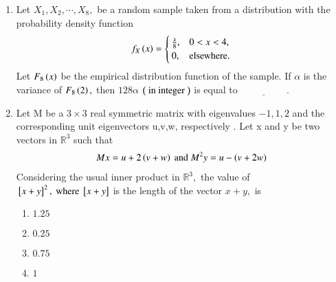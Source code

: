 \documentclass[journal]{IEEEtran}
\begin{document}
\begin{enumerate} [start=27]
\bigskip
\item Let $X_{1},X_{2},\cdots,X_{8},$ be a random sample taken from a distribution with the probability density function
\begin{align*}
    f_{X}\left(x\right) = 
\begin{cases} 
\frac{x}{8}, & 0 < x < 4, \\
0, & \text{elsewhere}.
\end{cases}
\end{align*}
Let $F_{8}\left(x\right)$ be the empirical distribution function of the sample. If $\alpha$ is the variance of  $F_{8}\left(2\right),$ then $128\alpha$  $\left(\text{ in integer }\right)$  is equal to $\underline{\hspace{2cm}}.$
\bigskip
\item Let M be a $3\times3$ real symmetric matrix with eigenvalues $-1,1,2$ and the corresponding unit eigenvectors u,v,w, respectively . Let x and y be two vectors in $\mathbb{R}^{3}$ such that
\begin{align*}
    Mx=u+2\left(v+w\right) \text{ and }  M^{2}y=u-\left(v+2w\right)
\end{align*}
Considering the usual inner product in $\mathbb{R}^{3},$ the value of ${}\left[x+y\right]^{2},\text{ where }{}\left[x+y\right]$ is the length of the vector $x+y , $ is 
\begin{enumerate}
    \item $1.25$
    \item $0.25$
    \item $0.75$
    \item $1$
    

\end{enumerate}
\end{enumerate}
\end{document}
